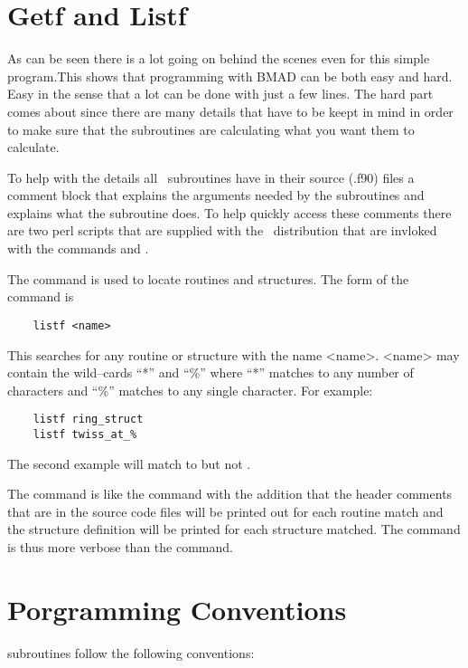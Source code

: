 \section{Getf and Listf}

As can be seen there is a lot going on behind the scenes even for this
simple program.This shows that programming with BMAD can be both easy
and hard. Easy in the sense that a lot can be done with just a few
lines. The hard part comes about since there are many details that
have to be keept in mind in order to make sure that the subroutines
are calculating what you want them to calculate.

To help with the details all \bmad\ subroutines have in their source (.f90)
files a comment block that explains the arguments needed by the
subroutines and explains what the subroutine does. To help quickly
access these comments there are two perl scripts that are supplied
with the \bmad\ distribution that are invloked with the commands
 and .

The  command is used to locate routines and structures.
The form of the command is
\begin{verbatim}
    listf <name>
\end{verbatim}
This searches for any routine or structure with the name
<name>. <name> may contain the wild--cards ``*'' and ``\%'' where
``*'' matches to any number of characters and ``\%'' matches to any
single character. For example:
\begin{verbatim}
    listf ring_struct
    listf twiss_at_%
\end{verbatim}
The second example will match to  but not
.

The  command is like the  command with the
addition that the header comments that are in the source code files
will be printed out for each routine match and the structure definition
will be printed for each structure matched. The  command is
thus more verbose than the  command.

\section{Porgramming Conventions}

\BMAD subroutines follow the following conventions:

